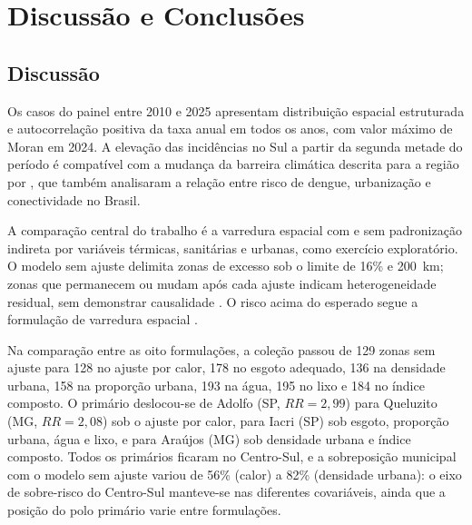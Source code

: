 \chapter{Discussão e Conclusões}
\label{cap:discussao}

\section{Discussão}
\label{sec:discussao}

Os \ScanTotalCasos{} casos do painel entre 2010 e 2025 apresentam distribuição espacial estruturada e autocorrelação positiva da taxa anual em todos os anos, com valor máximo de Moran em 2024. A elevação das incidências no Sul a partir da segunda metade do período é compatível com a mudança da barreira climática descrita para a região por , que também analisaram a relação entre risco de dengue, urbanização e conectividade no Brasil.

A comparação central do trabalho é a varredura espacial com e sem padronização indireta por variáveis térmicas, sanitárias e urbanas, como exercício exploratório. O modelo sem ajuste delimita zonas de excesso sob o limite de 16\% e 200~km; zonas que permanecem ou mudam após cada ajuste indicam heterogeneidade residual, sem demonstrar causalidade \cite{jung2009glm}. O risco acima do esperado segue a formulação de varredura espacial \cite{kulldorff1997spatial}.

Na comparação entre as oito formulações, a coleção passou de 129 zonas sem ajuste para 128 no ajuste por calor, 178 no esgoto adequado, 136 na densidade urbana, 158 na proporção urbana, 193 na água, 195 no lixo e 184 no índice composto. O primário deslocou-se de Adolfo (SP, $RR = 2{,}99$) para Queluzito (MG, $RR = 2{,}08$) sob o ajuste por calor, para Iacri (SP) sob esgoto, proporção urbana, água e lixo, e para Araújos (MG) sob densidade urbana e índice composto. Todos os primários ficaram no Centro-Sul, e a sobreposição municipal com o modelo sem ajuste variou de 56\% (calor) a 82\% (densidade urbana): o eixo de sobre-risco do Centro-Sul manteve-se nas diferentes covariáveis, ainda que a posição do polo primário varie entre formulações.

